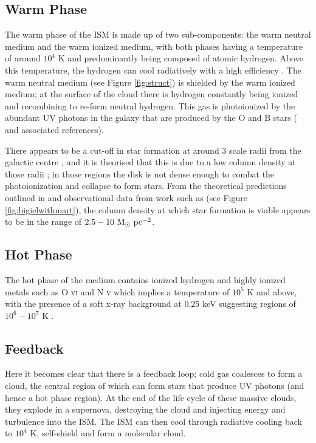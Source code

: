 \subsection{Warm Phase}

The warm phase of the ISM is made up of two sub-components: the warm neutral medium and the warm ionized medium, with both phases having a temperature of around $10^4$ K and predominantly being composed of atomic hydrogen.
Above this temperature, the hydrogen can cool radiatively with a high efficiency \citep{gnat_time-dependent_2007}.
The warm neutral medium (see Figure \ref{fig:struct}) is shielded by the warm ionized medium; at the surface of the cloud there is hydrogen constantly being ionized and recombining to re-form neutral hydrogen.
This gas is photoionized by the abundant UV photons in the galaxy that are produced by the O and B stars (\citet{lefloch_photoionization_2001} and associated references).

There appears to be a cut-off in star formation at around 3 scale radii from the galactic centre \citep{kennicutt_star_1989, martin_star_2001}, and it is theorised that this is due to a low column density at those radii \citep{schaye_star_2004}; in those regions the disk is not dense enough to combat the photoionization and collapse to form stars.
From the theoretical predictions outlined in \citep{schaye_star_2004} and observational data from work such as \citet{bigiel_star_2008} (see Figure \ref{fig:bigielwithmart}), the column density at which star formation is viable appears to be in the range of $2.5 - 10 ~\mathrm{M}_{\odot} ~\mathrm{pc}^{-2}$.

\subsection{Hot Phase}

The hot phase of the medium contains ionized hydrogen and highly ionized metals such as O \textsc{vi} and N \textsc{v} which implies a temperature of $10^{5}$ K and above, with the presence of a soft x-ray background at 0.25 keV suggesting regions of $10^6 - 10^7$ K \citep{ferriere_interstellar_2001}.

\subsection{Feedback}

Here it becomes clear that there is a feedback loop; cold gas coalesces to form a cloud, the central region of which can form stars that produce UV photons (and hence a hot phase region).
At the end of the life cycle of these massive clouds, they explode in a supernova, destroying the cloud and injecting energy and turbulence into the ISM.
The ISM can then cool through radiative cooling back to $10^4$ K, self-shield and form a molecular cloud.

